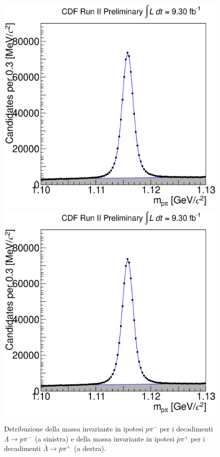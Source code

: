 \documentclass[a4paper,10pt]{article}
\newcommand{\proton}{\ensuremath{p}}
\newcommand{\antiproton}{\ensuremath{\bar{p}}}
\newcommand{\lambdazero}{\ensuremath{\Lambda}}
\newcommand{\lambdazeroppi}{\ensuremath{\lambdazero \to \proton\pi^-}}
\newcommand{\alambdazeroppi}{\ensuremath{\bar{\lambdazero} \to \antiproton \pi^+}}
\begin{document}
\begin{figure}[!ht]
\begin{center}
\includegraphics[scale=0.34]{./fig/canvas_fit_AL.eps}
\hspace{0.6cm}
\includegraphics[scale=0.34]{./fig/canvas_fit_AL.eps}
\end{center}
\caption[Massa Invariante]{Dstribuzione della massa invariante in ipotesi $p\pi^-$ per i decadimenti 
\lambdazeroppi\ (a sinistra)  e  della massa invariante in ipotesi  $\bar{p}\pi^{+}$ per i decadimenti \alambdazeroppi\ (a destra).}
\label{fig:massa_invariante2}
\end{figure}
\end{document}
